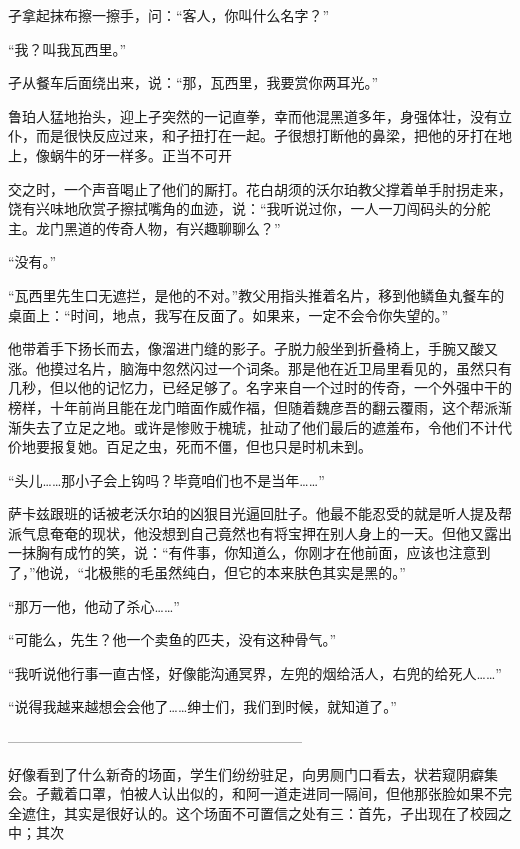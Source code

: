 \documentclass{article}
\begin{document}
孑拿起抹布擦一擦手，问：“客人，你叫什么名字？”

“我？叫我瓦西里。”

孑从餐车后面绕出来，说：“那，瓦西里，我要赏你两耳光。”

鲁珀人猛地抬头，迎上孑突然的一记直拳，幸而他混黑道多年，身强体壮，没有立仆，而是很快反应过来，和孑扭打在一起。孑很想打断他的鼻梁，把他的牙打在地上，像蜗牛的牙一样多。正当不可开

\newpage 

交之时，一个声音喝止了他们的厮打。花白胡须的沃尔珀教父撑着单手肘拐走来，饶有兴味地欣赏孑擦拭嘴角的血迹，说：“我听说过你，一人一刀闯码头的分舵主。龙门黑道的传奇人物，有兴趣聊聊么？”

“没有。”

“瓦西里先生口无遮拦，是他的不对。”教父用指头推着名片，移到他鳞鱼丸餐车的桌面上：“时间，地点，我写在反面了。如果来，一定不会令你失望的。”

他带着手下扬长而去，像溜进门缝的影子。孑脱力般坐到折叠椅上，手腕又酸又涨。他摸过名片，脑海中忽然闪过一个词条。那是他在近卫局里看见的，虽然只有几秒，但以他的记忆力，已经足够了。名字来自一个过时的传奇，一个外强中干的榜样，十年前尚且能在龙门暗面作威作福，但随着魏彦吾的翻云覆雨，这个帮派渐渐失去了立足之地。或许是惨败于槐琥，扯动了他们最后的遮羞布，令他们不计代价地要报复她。百足之虫，死而不僵，但也只是时机未到。

“头儿……那小子会上钩吗？毕竟咱们也不是当年……”

\newpage 



萨卡兹跟班的话被老沃尔珀的凶狠目光逼回肚子。他最不能忍受的就是听人提及帮派气息奄奄的现状，他没想到自己竟然也有将宝押在别人身上的一天。但他又露出一抹胸有成竹的笑，说：“有件事，你知道么，你刚才在他前面，应该也注意到了，”他说，“北极熊的毛虽然纯白，但它的本来肤色其实是黑的。”

“那万一他，他动了杀心……”

“可能么，先生？他一个卖鱼的匹夫，没有这种骨气。”

“我听说他行事一直古怪，好像能沟通冥界，左兜的烟给活人，右兜的给死人……”

“说得我越来越想会会他了……绅士们，我们到时候，就知道了。”

—————————————————————

好像看到了什么新奇的场面，学生们纷纷驻足，向男厕门口看去，状若窥阴癖集会。孑戴着口罩，怕被人认出似的，和阿一道走进同一隔间，但他那张脸如果不完全遮住，其实是很好认的。这个场面不可置信之处有三：首先，孑出现在了校园之中；其次
\end{document}
